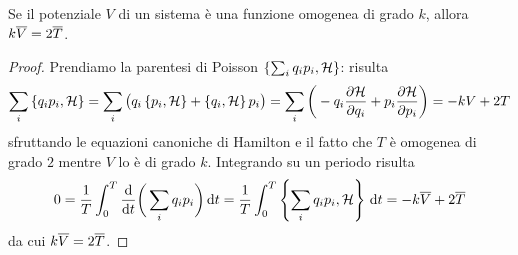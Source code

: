 \begin{teorema} \label{t:viriale}
	Se il potenziale $V$ di un sistema è una funzione omogenea di grado $k$, allora $k\overline{V}=2\overline{T}$.
\end{teorema}
\begin{proof}
	Prendiamo la parentesi di Poisson $\left\{ {\sum_iq_ip_i},{\mathcal H}\right\}$: risulta
	\begin{equation}
		\sum_i\left\{ {q_ip_i},{\mathcal H}\right\}=\sum_i\big(q_i\left\{ {p_i},{\mathcal H}\right\}+\left\{ {q_i},{\mathcal H}\right\}p_i\big)=\sum_i\bigg(-q_i\frac{\partial {\mathcal H}}{\partial {q_i}}+p_i\frac{\partial {\mathcal H}}{\partial {p_i}}\bigg)=-kV+2T
	\end{equation}
	sfruttando le equazioni canoniche di Hamilton e il fatto che $T$ è omogenea di grado $2$ mentre $V$ lo è di grado $k$.
	Integrando su un periodo risulta
	\begin{equation}
		0=\frac1{T}\int_0^T\frac{\textup{d} {}}{\textup{d} {t}}\bigg(\sum_iq_ip_i\bigg)\,\textup{d} t=\frac1{T}\int_0^T\left\{ {\sum_iq_ip_i},{\mathcal H}\right\}\,\textup{d} t=-k\overline{V}+2\overline{T}
	\end{equation}
	da cui $k\overline{V}=2\overline{T}$.
\end{proof}

